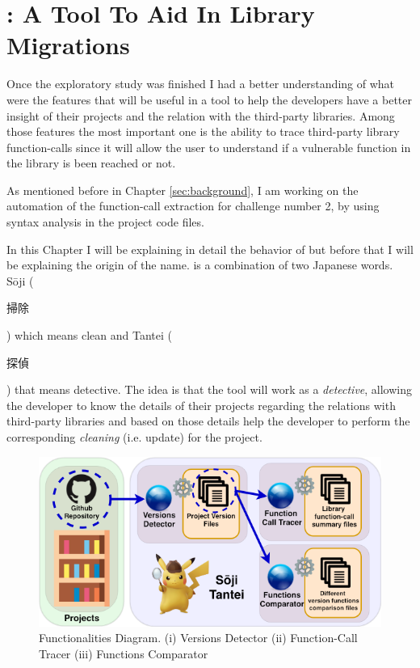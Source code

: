 \chapter{\texorpdfstring{\tool[]}{SojiTantei}: A Tool To Aid In Library Migrations}
\label{sec:specification}

Once the exploratory study was finished I had a better understanding of what were the features that will be useful in a tool to help the developers have a better insight of their projects and the relation with the third-party libraries. Among those features the most important one is the ability to trace third-party library function-calls since it will allow the user to understand if a vulnerable function in the library is been reached or not.

As mentioned before in Chapter \ref{sec:background}, I am working on the automation of the function-call extraction for challenge number 2, by using syntax analysis in the project code files. 

In this Chapter I will be explaining in detail the behavior of \tool[] but before that I will be explaining the origin of the name. \tool[] is a combination of two Japanese words. S\={o}ji (\begin{CJK}{UTF8}{min}掃除\end{CJK}) which means clean and Tantei (\begin{CJK}{UTF8}{min}探偵\end{CJK})
that means detective. The idea is that the tool will work as a \textit{detective}, allowing the developer to know the details of their projects regarding the relations with third-party libraries and based on those details help the developer to perform the corresponding \textit{cleaning} (i.e. update) for the project.

\begin{figure}[ht!]
\centering
\includegraphics[width=1\textwidth]{images/tool_approach.png}
\caption{\tool[] Functionalities Diagram. (i) Versions Detector (ii) Function-Call Tracer (iii) Functions Comparator}
\label{fig:sojiApproach}
\end{figure}

